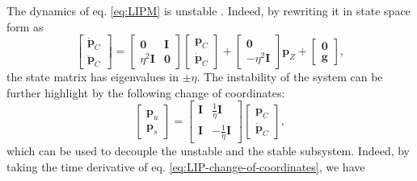 The dynamics of eq. \eqref{eq:LIPM} is unstable \cite{Scianca2020TRO}. Indeed,
by rewriting it in state space form as
\begin{equation}
    \label{eq:LIPM-state-space}
    \begin{bmatrix}
        \dot{\bm{p}}_C \\ \ddot{\bm{p}}_C
    \end{bmatrix}
    =
    \begin{bmatrix}
        \bm{0}        & \bm{I} \\
        \eta^2 \bm{I} & \bm{0}
    \end{bmatrix}
    \begin{bmatrix}
        \bm{p}_C \\ \dot{\bm{p}}_C
    \end{bmatrix}
    +
    \begin{bmatrix}
        \bm{0} \\ -\eta^2 \bm{I}
    \end{bmatrix}
    \bm{p}_Z 
    +
    \begin{bmatrix}
        \bm{0} \\ \bm{g}
    \end{bmatrix},
\end{equation}
the state matrix has eigenvalues in $\pm\eta$. The instability of the system
can be further highlight by the following change of coordinates:
\begin{equation}
    \label{eq:LIP-change-of-coordinates}
    \begin{bmatrix}
        \bm{p}_u \\ \bm{p}_s
    \end{bmatrix}
    =
    \begin{bmatrix}
        \bm{I} &  \frac{1}{\eta} \bm{I} \\
        \bm{I} & -\frac{1}{\eta} \bm{I}
    \end{bmatrix}
    \begin{bmatrix}
        \bm{p}_C\\ \dot{\bm{p}}_C
    \end{bmatrix},
\end{equation}
which can be used to decouple the unstable and the stable subsystem. Indeed,
by taking the time derivative of eq. \eqref{eq:LIP-change-of-coordinates}, we
have

